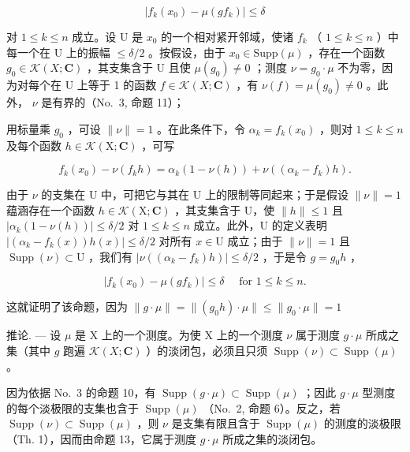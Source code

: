 \[
\left| f _ {k} \left(x _ {0}\right) - \mu \left(g f _ {k}\right) \right| \leqslant \delta
\]

对 \(1 \leqslant k \leqslant n\) 成立。设 U 是 \(x_0\) 的一个相对紧开邻域，使诸 \(f_k\) （ \(1 \leqslant k \leqslant n\) ）中每一个在 U 上的振幅 \(\leqslant \delta/2\) 。按假设，由于 \(x_0 \in \text{Supp}(\mu)\) ，存在一个函数 \(g_0 \in \mathcal{K}(X; \mathbf{C})\) ，其支集含于 U 且使 \(\mu(g_0) \neq 0\) ；测度 \(\nu = g_0 \cdot \mu\) 不为零，因为对每个在 U 上等于 1 的函数 \(f \in \mathcal{K}(X; \mathbf{C})\) ，有 \(\nu(f) = \mu(g_0) \neq 0\) 。此外， \(\nu\) 是有界的（No.~3, 命题 11）；

用标量乘 \(g_{0}\) ，可设 \(\|\nu\|=1\) 。在此条件下，令 \(\alpha_{k}=f_{k}(x_{0})\) ，则对 \(1\leqslant k\leqslant n\) 及每个函数 \(h\in\mathcal{K}(\mathrm{X};\mathbf{C})\) ，可写

\[
f _ {k} (x _ {0}) - \nu (f _ {k} h) = \alpha_ {k} (1 - \nu (h)) + \nu ((\alpha_ {k} - f _ {k}) h).
\]

由于 \(\nu\) 的支集在 U 中，可把它与其在 U 上的限制等同起来；于是假设 \(\| \nu \| = 1\) 蕴涵存在一个函数 \(h \in \mathcal{K}(\mathrm{X};\mathbf{C})\) ，其支集含于 U，使 \(\| h \| \leqslant 1\) 且 \(|\alpha_{k}(1 - \nu (h))| \leqslant \delta / 2\) 对 \(1 \leqslant k \leqslant n\) 成立。此外，U 的定义表明 \(|(\alpha_{k} - f_{k}(x))h(x)| \leqslant \delta / 2\) 对所有 \(x \in \mathrm{U}\) 成立；由于 \(\| \nu \| = 1\) 且 \(\operatorname{Supp}(\nu) \subset \mathrm{U}\) ，我们有 \(|\nu ((\alpha_{k} - f_{k})h)| \leqslant \delta / 2\) ，于是令 \(g = g_0h\) ，

\[
\left| f _ {k} \left(x _ {0}\right) - \mu \left(g f _ {k}\right) \right| \leqslant \delta \quad \text { for } 1 \leqslant k \leqslant n.
\]

这就证明了该命题，因为 \(\| g\cdot \mu \| = \| (g_0h)\cdot \mu \| \leqslant \| g_0\cdot \mu \| = 1\)

推论. --- 设 \(\mu\) 是 X 上的一个测度。为使 X 上的一个测度 \(\nu\) 属于测度 \(g \cdot \mu\) 所成之集（其中 \(g\) 跑遍 \(\mathcal{K}(X; \mathbf{C})\) ）的淡闭包，必须且只须 \(\operatorname{Supp}(\nu) \subset \operatorname{Supp}(\mu)\) 。

因为依据 No.~3 的命题 10，有 \(\operatorname{Supp}(g\cdot\mu)\subset\operatorname{Supp}(\mu)\) ；因此 \(g\cdot\mu\) 型测度的每个淡极限的支集也含于 \(\operatorname{Supp}(\mu)\) （No.~2, 命题 6）。反之，若 \(\operatorname{Supp}(\nu)\subset\operatorname{Supp}(\mu)\) ，则 \(\nu\) 是支集有限且含于 \(\operatorname{Supp}(\mu)\) 的测度的淡极限（Th. 1），因而由命题 13，它属于测度 \(g\cdot\mu\) 所成之集的淡闭包。

